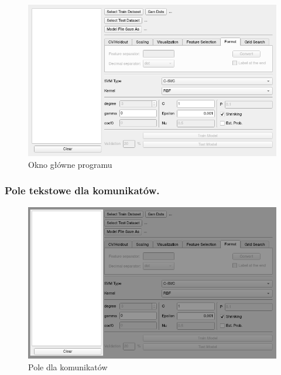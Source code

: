 \documentclass[paper=a4, fontsize=11pt]{scrartcl} %
\numberwithin{equation}{section} %
\numberwithin{figure}{section} %
\begin{document}
    \begin{figure}[h]
        \begin{center}
            \includegraphics[scale=0.7]{./img/svm_app_main_window.png}
            \caption{Okno główne programu}
            \label{fig:main_window}
        \end{center}
    \end{figure}

\newpage %
\subsubsection{Pole tekstowe dla komunikatów.}

    \begin{figure}[h]
        \begin{center}
            \includegraphics[scale=0.7]{./img/svm_app_mainw_textedit.png}
            \caption{Pole dla komunikatów}
            \label{fig:text_edit}
        \end{center}
    \end{figure}
\end{document}
